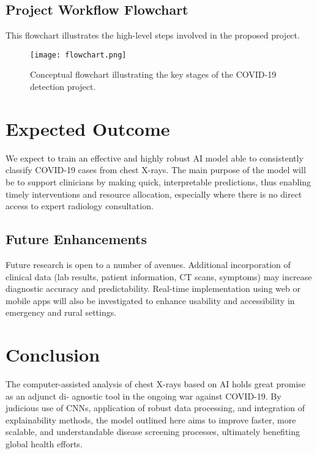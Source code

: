 \documentclass[10pt, a4paper]{article}
\begin{document}
\subsection*{Project Workflow Flowchart}
This flowchart illustrates the high-level steps involved in the proposed project.

\begin{figure}[h!]
    \centering
    \texttt{[image: flowchart.png]}
    \caption{Conceptual flowchart illustrating the key stages of the COVID-19 detection project.}
    \label{fig:flowchart}
\end{figure}

\section*{Expected Outcome}
We expect to train an effective and highly robust AI model able to consistently classify COVID-19 cases from chest X-rays. The main purpose of the model will be to support clinicians by making quick, interpretable predictions, thus enabling timely interventions and resource allocation, especially where there is no direct access to expert radiology consultation.

\subsection*{Future Enhancements}
Future research is open to a number of avenues. Additional incorporation of clinical data (lab results, patient information, CT scans, symptoms) may increase diagnostic accuracy and predictability. Real-time implementation using web or mobile apps will also be investigated to enhance usability and accessibility in emergency and rural settings.

\section*{Conclusion}
The computer-assisted analysis of chest X-rays based on AI holds great promise as an adjunct di- agnostic tool in the ongoing war against COVID-19. By judicious use of CNNs, application of robust data processing, and integration of explainability methods, the model outlined here aims to improve faster, more scalable, and understandable disease screening processes, ultimately benefiting global health efforts.
\end{document}
